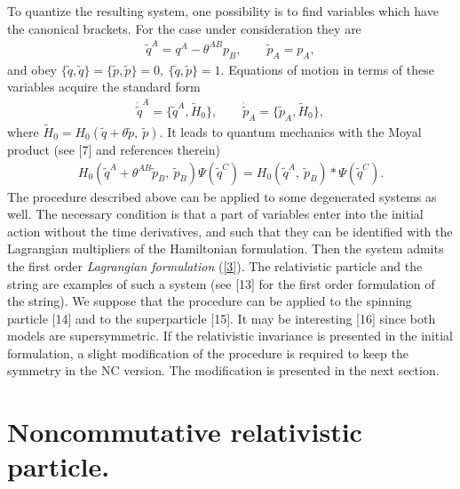 \documentclass[paper a4]{article}
\begin{document}
To quantize the resulting system, one possibility is to find variables
which have the canonical brackets. For the case under consideration
they are
\begin{eqnarray}\label{9}
\tilde q^A=q^A-\theta^{AB}p_B, \qquad \tilde p_A=p_A,
\end{eqnarray}
and obey $\{\tilde q, \tilde q\}=\{\tilde p, \tilde p\}=0, ~
\{\tilde q, \tilde p\}=1$. Equations of motion in terms
of these variables acquire the standard form
\begin{eqnarray}\label{10}
\dot{\tilde q}^A=\{\tilde q^A, \tilde H_0\}, \qquad
\dot{\tilde p}_A=\{\tilde p_A, \tilde H_0\},
\end{eqnarray}
where $\tilde H_0=H_0(\tilde q+\theta\tilde p, ~ \tilde p)$. It leads to
quantum
mechanics with the Moyal product (see [7] and references therein)
\begin{eqnarray}\label{11}
H_0(\tilde q^A+\theta^{AB}\tilde p_B, ~ \tilde p_B)\Psi(\tilde q^C)=
H_0(\tilde q^A, ~ \tilde p_B)*\Psi(\tilde q^C).
\end{eqnarray}
The procedure described above can be
applied to some degenerated systems as well. The necessary condition
is that a part of
variables enter into the initial action without the time derivatives,
and such that they can be identified with
the Lagrangian multipliers of the Hamiltonian formulation.
Then the system admits the first order {\em Lagrangian formulation}
(\ref{3}). The relativistic
particle and the string are examples of such a system (see [13] for the
first order formulation of the string). We suppose that the procedure
can be applied to the spinning particle [14] and to the superparticle [15].
It may be interesting [16] since both models are supersymmetric.
If the relativistic invariance is
presented in the initial formulation, a slight modification of
the procedure is required to keep the symmetry in the NC version. The
modification is presented in the next section.

\section{Noncommutative relativistic particle.}
\end{document}

